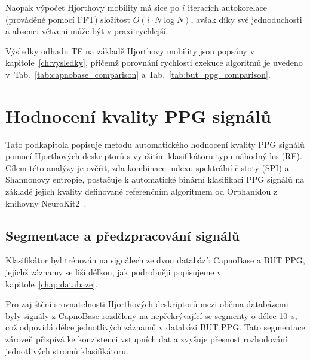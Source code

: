 Naopak výpočet Hjorthovy mobility má sice po \( i \) iteracích autokorelace (prováděné pomocí \acs{FFT}) složitost \( O(i \cdot N \log N) \), avšak díky své jednoduchosti a absenci větvení může být v praxi rychlejší.

Výsledky odhadu \acs{TF} na základě Hjorthovy mobility jsou popsány v kapitole~\ref{ch:vysledky}, přičemž porovnání rychlosti exekuce algoritmů je uvedeno v~Tab.~\ref{tab:capnobase_comparison} a Tab.~\ref{tab:but_ppg_comparison}.

\section{Hodnocení kvality PPG signálů}
\label{sec:hjorth_kvalita}
Tato podkapitola popisuje metodu automatického hodnocení kvality \acs{PPG} signálů pomocí Hjorthových deskriptorů s využitím klasifikátoru typu náhodný les (\acs{RF}).
Cílem této analýzy je ověřit, zda kombinace indexu spektrální čistoty (\acs{SPI}) a Shannonovy entropie, postačuje k automatické binární klasifikaci \acs{PPG} signálů na základě jejich kvality definované referenčním algoritmem od Orphanidou z knihovny NeuroKit2~\cite{NeuroKit2}.

\subsection*{Segmentace a předzpracování signálů}
\label{subsec:segmentace_predzpracovani}
Klasifikátor byl trénován na signálech ze dvou databází: CapnoBase a \acs{BUT PPG}, jejichž záznamy se liší délkou, jak podrobněji popisujeme v kapitole~\ref{chap:databaze}.

Pro zajištění srovnatelnosti Hjorthových deskriptorů mezi oběma databázemi byly signály z CapnoBase rozděleny na nepřekrývající se segmenty o délce 10~s, což odpovídá délce jednotlivých záznamů v databázi \acs{BUT PPG}.
Tato segmentace zároveň přispívá ke konzistenci vstupních dat a zvyšuje přesnost rozhodování jednotlivých stromů klasifikátoru.

